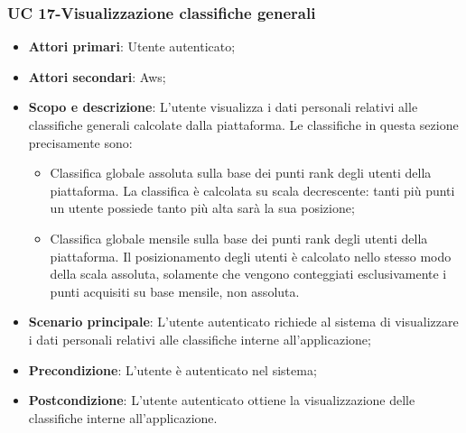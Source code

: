     \subsubsection{UC 17-Visualizzazione classifiche generali}  
      \begin{itemize}
        \item \textbf{Attori primari}: Utente autenticato;
        \item \textbf{Attori secondari}: Aws;
        \item \textbf{Scopo e descrizione}: L'utente visualizza i dati personali relativi alle classifiche generali calcolate dalla piattaforma. Le classifiche in questa sezione precisamente sono:
            \begin{itemize}
                \item Classifica globale assoluta sulla base dei punti rank degli utenti della piattaforma. La classifica è calcolata su scala decrescente: tanti più punti un utente possiede tanto più alta sarà la sua posizione;
                \item Classifica globale mensile sulla base dei punti rank degli utenti della piattaforma. Il posizionamento degli utenti è calcolato nello stesso modo della scala assoluta, solamente che vengono conteggiati esclusivamente i punti acquisiti su base mensile, non assoluta.
            \end{itemize}
            
        \item \textbf{Scenario principale}: L'utente autenticato richiede al sistema di visualizzare i dati personali relativi alle classifiche interne all'applicazione;
        \item \textbf{Precondizione}: L'utente è autenticato nel sistema;
        \item \textbf{Postcondizione}: L'utente autenticato ottiene la visualizzazione delle classifiche interne all'applicazione.
        \end{itemize}  
     
         
        
        
